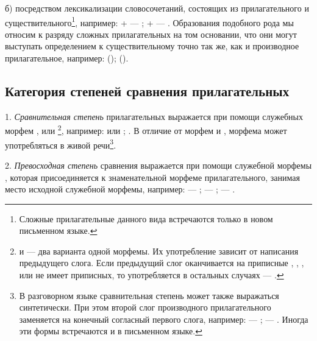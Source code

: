 б) посредством лексикализации словосочетаний, состоящих из прилагательного и существительного\footnote[28]{Сложные прилагательные данного вида встречаются только в новом письменном языке.}, например:
 +  --- ;
 +  --- .
Образования подобного рода мы относим к разряду сложных прилагательных на том основании, что они могут выступать определением к существительному точно так же, как и производное прилагательное, например:
 ();
 ().

\subsection{Категория степеней сравнения прилагательных}

1. \emph{Сравнительная степень} прилагательных выражается при помощи служебных морфем ,  или \footnote[29]{
     и  --- два варианта одной морфемы. Их употребление зависит от написания предыдущего слога. Если предыдущий слог оканчивается на приписные , , , 
    или не имеет приписных, то употребляется  в остальных случаях --- .
}, например:
 или ;
.
В отличие от морфем  и , морфема  может употребляться в живой речи\footnote[30]{
    В разговорном языке сравнительная степень может также выражаться синтетически. При этом второй слог производного прилагательного заменяется на конечный согласный первого слога, например:  --- ;  --- . Иногда эти формы встречаются и в письменном языке.
}.

2. \emph{Превосходная степень} сравнения выражается при помощи служебной морфемы , которая присоединяется к знаменательной морфеме прилагательного, занимая место исходной служебной морфемы, например:
 --- ;
 --- ;
 --- .

